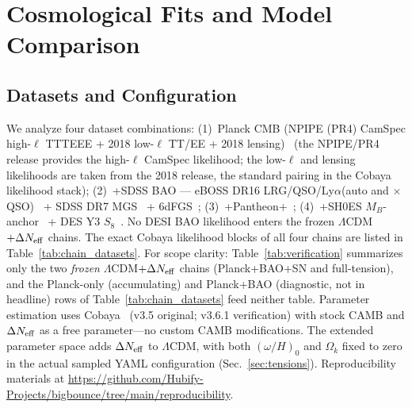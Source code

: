 \documentclass[aps,prd,twocolumn,superscriptaddress,showpacs,preprintnumbers,nofootinbib,longbibliography,floatfix]{revtex4-2}
\newcommand{\Neff}{N_{\rm eff}}
\begin{document}
\section{Cosmological Fits and Model Comparison}\label{sec:cosmo_fits}

\subsection{Datasets and Configuration}\label{sec:fullcomp}

We analyze four dataset combinations: (1)~Planck CMB (NPIPE (PR4) CamSpec high-$\ell$ TTTEEE + 2018 low-$\ell$ TT/EE + 2018 lensing)~\cite{Planck2018params}
(the NPIPE/PR4 release provides the high-$\ell$ CamSpec likelihood; the
low-$\ell$ and lensing likelihoods are taken from the 2018 release, the
standard pairing in the Cobaya likelihood stack);
(2)~+SDSS BAO --- eBOSS DR16 LRG/QSO/Ly$\alpha$(auto and
$\times$QSO)~\cite{eBOSS2021} + SDSS DR7 MGS~\cite{Ross2015MGS} +
6dFGS~\cite{Beutler20116dF}; (3)~+Pantheon+~\cite{Brout2022PantheonPlus}; (4)~+SH0ES
$M_B$-anchor~\cite{Riess2022} + DES Y3 $S_8$~\cite{DES2024}. No DESI BAO
likelihood enters the frozen $\Lambda$CDM$+\Delta\Neff$ chains. The exact
Cobaya likelihood blocks of all four chains are listed in
Table~\ref{tab:chain_datasets}. For scope
clarity: Table~\ref{tab:verification} summarizes only the two
\emph{frozen} $\Lambda$CDM$+\Delta\Neff$ chains (Planck+BAO+SN and
full-tension), and the Planck-only
(accumulating) and Planck+BAO (diagnostic, not in headline) rows of
Table~\ref{tab:chain_datasets} feed neither table. Parameter estimation
uses Cobaya~\cite{Cobaya2021} (v3.5 original; v3.6.1 verification) with
stock CAMB and $\Delta\Neff$ as a free parameter---no custom CAMB modifications.
The extended parameter space adds $\Delta\Neff$ to $\Lambda$CDM, with both
$(\omega/H)_0$ and $\Omega_k$ fixed to zero in the actual sampled YAML
configuration (Sec.~\ref{sec:tensions}). Reproducibility materials at
\url{https://github.com/Hubify-Projects/bigbounce/tree/main/reproducibility}.
\end{document}
